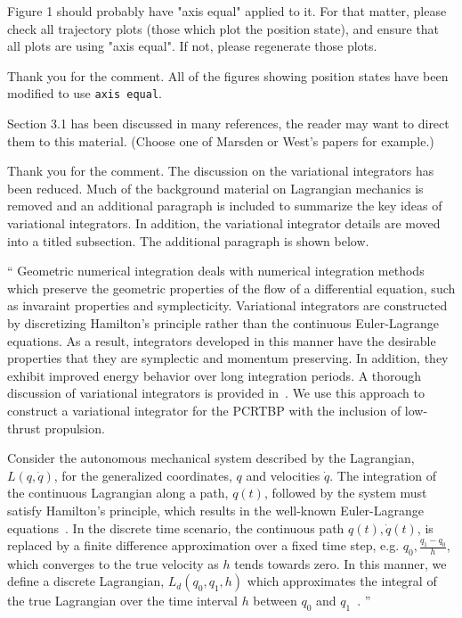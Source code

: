 \documentclass[11pt]{article}
\newenvironment{correction}{\begin{list}{}{\setlength{\leftmargin}{1cm}\setlength{\rightmargin}{1cm}}\vspace{\parsep}\item[]``}{''\end{list}}
\begin{document}
\begin{enumerate}
\item 
    \begin{itshape}
Figure 1 should probably have "axis equal" applied to it.  For that matter, please check all trajectory plots (those which plot the position state), and ensure that all plots are using "axis equal".  If not, please regenerate those plots. 
\end{itshape}

Thank you for the comment.
All of the figures showing position states have been modified to use \texttt{axis equal}.

\item 
    \begin{itshape}
Section 3.1 has been discussed in many references, the reader may want to direct them to this material.
(Choose one of Marsden or West's papers for example.)
\end{itshape}

Thank you for the comment.
The discussion on the variational integrators has been reduced. 
Much of the background material on Lagrangian mechanics is removed and an additional paragraph is included to summarize the key ideas of variational integrators. 
In addition, the variational integrator details are moved into a titled subsection.
The additional paragraph is shown below.

\begin{correction}
Geometric numerical integration deals with numerical integration methods which preserve the geometric properties of the flow of a differential equation, such as invaraint properties and symplecticity.
Variational integrators are constructed by discretizing Hamilton's principle rather than the continuous Euler-Lagrange equations.
As a result, integrators developed in this manner have the desirable properties that they are symplectic and momentum preserving.
In addition, they exhibit improved energy behavior over long integration periods.
A thorough discussion of variational integrators is provided in~\cite{west2004,marsden2001}.
We use this approach to construct a variational integrator for the PCRTBP with the inclusion of low-thrust propulsion.

Consider the autonomous mechanical system described by the Lagrangian, \( L(q, \dot{q} ) \), for the generalized coordinates, \( q\) and velocities \( \dot{q} \).
The integration of the continuous Lagrangian along a path, \( q (t) \), followed by the system must satisfy Hamilton's principle, which results in the well-known Euler-Lagrange equations~\cite{lanczos1970}.
In the discrete time scenario, the continuous path \( q(t), \dot{q}(t) \), is replaced by a finite difference approximation over a fixed time step, e.g. \( q_0, \frac{q_1 - q_0}{h} \), which converges to the true velocity as \( h \) tends towards zero.
In this manner, we define a discrete Lagrangian, \( L_d (q_0, q_1, h) \) which approximates the integral of the true Lagrangian over the time interval \( h \) between \( q_0 \) and \( q_1\)~\cite{marsden2001}.
\end{correction}


\end{enumerate}
\end{document}
